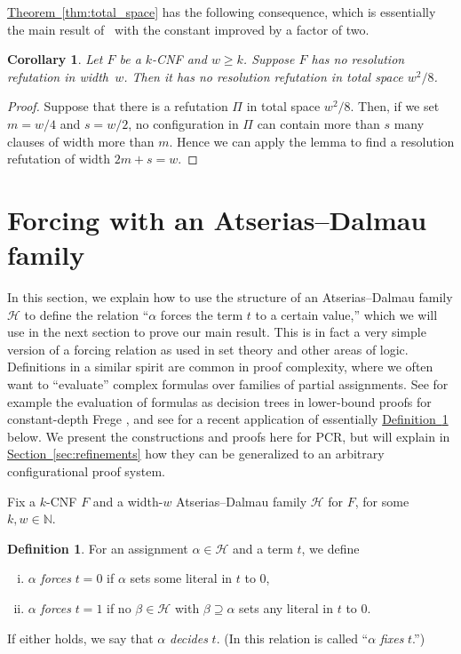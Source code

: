 \documentclass[11pt]{article}
\numberwithin{equation}{section}
\newtheorem{corollary}[theorem]{Corollary}
\theoremstyle{definition}
\newtheorem{definition}[theorem]{Definition}
\theoremstyle{plain}
\newcommand{\N}{\mathbb N}
\newcommand{\expref}[2]{\hyperref[#2]{#1~\ref{#2}}}
\newcommand\calH{\mathcal{H}}
\begin{document}
\expref{Theorem}{thm:total_space} has the following consequence, which is essentially
the main result of~\cite{DBLP:conf/icalp/Bonacina16} with 
the constant improved by a factor of two.


\begin{corollary}
\label{cor:Bon}
Let $F$ be a $k$-CNF and $w \ge k$.
Suppose $F$ has no resolution refutation in width~$w$.
Then it has no resolution refutation in total space ${w}^2/8$.
\end{corollary}

\begin{proof}
Suppose that there is a refutation $\Pi$ in total space ${w}^2/8$.
Then, if we set $m=w/4$ and $s=w/2$, no configuration in $\Pi$
can contain more than $s$ many clauses of width more than $m$.
Hence we can apply the lemma to find a resolution refutation
of width $2m+s = w$.
\end{proof}




%
\section{Forcing with an Atserias--Dalmau family}\label{sec:forcing}
%

In this section, we explain how to use the structure of an Atserias--Dalmau family $\calH$
to define the relation ``$\alpha$ forces the term $t$ to a certain value,''
which we will use in the next section to prove our main result.
This is in fact a very simple version of a forcing relation as used in  
set theory and other areas of logic. 
Definitions in a similar spirit are common in proof complexity, where we
often want to ``evaluate'' complex formulas over families of partial assignments.
See for example the evaluation of formulas as decision trees in lower-bound
proofs for constant-depth %
Frege \cite{Pitassi_PHP, Krajicek_PHP},   %
and see \cite{Pudlak2019, kolodziejczyk2018approximate} 
for a recent application of essentially \expref{Definition}{def:fixing} below.
We present the constructions and proofs here for PCR, but
will explain in \expref{Section}{sec:refinements}
how they can be generalized to an arbitrary configurational proof system.

Fix a $k$-CNF $F$ and a width-$w$ Atserias--Dalmau family $\calH$
for $F$, for some $k,w \in \N$.

\begin{definition} \label{def:fixing}
For an assignment $\alpha \in \calH$ and a term $t$, we define
\begin{enumerate}[(i)]
\item
$\alpha$ \emph{forces} $t=0$ if $\alpha$ sets some literal in $t$ to $0$,
\item
$\alpha$ \emph{forces} $t=1$ if no $\beta \in \calH$ with $\beta \supseteq \alpha$ sets any
literal in $t$ to $0$. 
\end{enumerate}
If either holds, 
we say that $\alpha$ \emph{decides} $t$.
(In \cite{conf-version,Pudlak2019} this relation is called 
``$\alpha$ \emph{fixes} $t$.'')
\end{definition}
\end{document}
